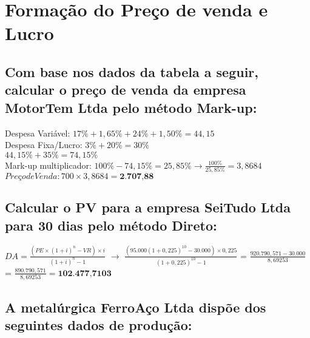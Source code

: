 \documentclass[report]{uftex}
\begin{document}
\chapter{Formação do Preço de venda e Lucro}

\section{ Com base nos dados da tabela a seguir, calcular o preço de venda da empresa MotorTem Ltda pelo método Mark-up:}

Despesa Variável: $17\% + 1,65\% + 24\% + 1,50\% = 44,15$ \\ 
Despesa Fixa/Lucro: $3\% + 20\% = 30\%$ \\
$44,15\% + 35\% = 74,15\%$  \\
Mark-up multiplicador: $100\% - 74,15\% = 25,85\% \rightarrow \frac{100\%}{25,85\%} = 3,8684$ \\
$Preço de Venda: 700 \times 3,8684 = \textbf{2.707,88}$ 

\section{ Calcular o PV para a empresa SeiTudo Ltda para 30 dias pelo método Direto:}

$DA = \frac{(PE \times (1+i)^n - VR) \times i}{(1+i)^n -1}$ $\rightarrow$ $\frac{(95.000(1+0,225)^{10}-30.000) \times 0,225}{(1+0,225)^{10}-1}$ = $\frac{920.790,571 - 30.000}{8,69253}$ = $\frac{890.790,571}{8,69253} = \textbf{102.477,7103}$

\section{A metalúrgica FerroAço Ltda dispõe dos seguintes dados de produção:}
\end{document}

